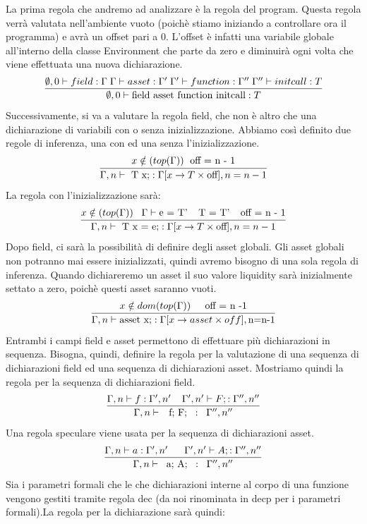 \documentclass[12pt, a4paper]{report}
\begin{document}
La prima regola che andremo ad analizzare è la regola del program. Questa regola verrà valutata nell'ambiente vuoto (poichè stiamo iniziando a controllare ora il programma) e avrà un offset pari a 0. L'offset è infatti una variabile globale all'interno della classe Environment che parte da zero e diminuirà ogni volta che viene effettuata una nuova dichiarazione. 
    \[\infer{ \emptyset, 0 \vdash \mbox{field asset function initcall} : T}
    {\emptyset, 0 \vdash field: \Gamma \; \Gamma \vdash asset: \Gamma' \;\Gamma'\vdash function : \Gamma'' \; \Gamma'' \vdash initcall : T}\]
Successivamente, si va a valutare la regola field, che non è altro che una dichiarazione di variabili con o senza inizializzazione. Abbiamo così definito due regole di inferenza, una con ed una senza l'inizializzazione.
    \[\infer{\Gamma, n \vdash \mbox{ T x;} : \Gamma[x \rightarrow T \times \mbox{off} ], n = n-1}{ x \notin (top(\Gamma)) \;\mbox{ off = n - 1}} \]
La regola con l'inizializzazione sarà:
    \[ \infer{\Gamma, n \vdash \mbox{ T x = e;} : \Gamma[x \rightarrow T \times \mbox{off} ], n = n-1}
    { x \notin (top(\Gamma)) \;\;\; \Gamma \vdash \mbox{e = T'} \;\;\;\; \mbox{T = T'} \;\;\;\; \mbox{off = n - 1}}\]
Dopo field, ci sarà la possibilità di definire degli asset globali. Gli asset globali non potranno mai essere inizializzati, quindi avremo bisogno di una sola regola di inferenza. Quando dichiareremo un asset il suo valore liquidity sarà inizialmente settato a zero, poichè questi asset saranno vuoti.
    \[\infer{\Gamma, n \vdash \mbox{asset x;} : \Gamma[x \rightarrow asset \times off], \mbox{n=n-1}}
    {x \notin dom(top(\Gamma)) \;\;\;\; \mbox{ off = n -1}} \]
Entrambi i campi field e asset permettono di effettuare più dichiarazioni in sequenza. Bisogna, quindi, definire la regola per la valutazione di una sequenza di dichiarazioni field ed una sequenza di dichiarazioni asset. Mostriamo quindi la regola per la sequenza di dichiarazioni field.
\[\infer{\Gamma, n \vdash \;\;\, \mbox{f; F;}\;\; :\;\; \Gamma'', n''}
{\Gamma, n \vdash f: \Gamma',n' \;\;\;\; \Gamma', n' \vdash F; : \Gamma'', n'' }\]
Una regola speculare viene usata per la sequenza di dichiarazioni asset.\\
\[\infer{\Gamma, n \vdash \;\;\mbox{a; A;} \;\;:\;\; \Gamma'', n''}
{\Gamma, n \vdash a: \Gamma',n' \;\;\;\;\;\; \Gamma', n' \vdash A; : \Gamma'', n'' }\]
Sia i parametri formali che le che dichiarazioni interne al corpo di una funzione vengono gestiti tramite regola dec (da noi rinominata in decp per i parametri formali).La regola per la dichiarazione sarà quindi:
\end{document}
